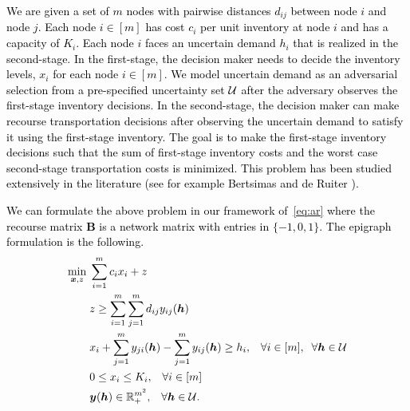\documentclass[moor]{informs1}              %
\newcommand{\mb}[1]{\ensuremath{\boldsymbol{#1}}}
\newcommand*{\red}{\textcolor{black}}
\begin{document}
\red{ We are given a set of $m$ nodes with pairwise distances $d_{ij}$ between node $i$ and node $j$. Each node $i \in [m]$ has cost $c_i$ per unit inventory at node $i$ and has a capacity of $K_i$. Each node $i$ faces an uncertain demand $h_i$ that is realized in the second-stage. In the first-stage, the decision maker needs to decide the inventory levels, $x_i$ for each node $i \in [m]$. We model uncertain demand as an adversarial selection from a pre-specified uncertainty set ${\cal U}$ after the adversary observes the first-stage inventory decisions. In the second-stage, the decision maker can make recourse transportation decisions after observing the uncertain demand to satisfy it using the first-stage inventory. The goal is to make the first-stage inventory decisions such that the sum of first-stage inventory costs and the worst case second-stage transportation costs is minimized. This problem has been studied extensively in the literature (see for example Bertsimas and de Ruiter \cite{bertsimas2016duality}).}

\red{We can formulate the above problem in our framework of~\eqref{eq:ar} where the recourse matrix $\mb B$ is a network matrix with entries in $\{-1,0,1\}$. %
The epigraph formulation is the following.
\begin{equation}\label{eq:lot-sizing} 
\begin{aligned}
\min_{\mb x, z} \; &  \sum_{i=1}^m c_i x_i + z \\
& z \geq \sum_{i=1}^m \sum_{j=1}^m  d_{ij} y_{ij} ( \mb h) \\
&  x_i+  \sum_{j=1}^m y_{ji}( \mb h) - \sum_{j=1}^m y_{ij} ( \mb h) \geq h_i , \; \; \; \forall i \in [m], \; \; \forall \mb h \in {\cal U} \\
&  0 \leq x_i \leq K_i ,\; \; \; \forall i \in [m]\\
& \mb{y}(\mb{h}) \in  {\mathbb R}^{m^2}_+, \;  \; \; \forall \mb h \in {\cal U}.
\end{aligned}
\end{equation}}

\end{document}
